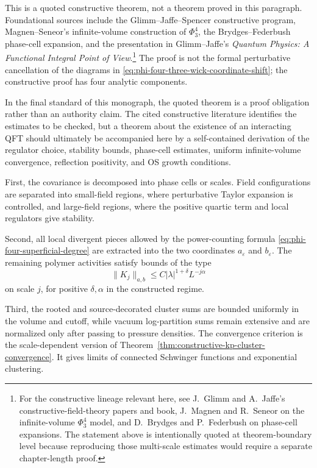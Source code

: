 This is a quoted constructive theorem, not a theorem proved in this
paragraph.  Foundational sources include the Glimm--Jaffe--Spencer
constructive program, Magnen--Seneor's infinite-volume construction of
\(\Phi^4_3\), the Brydges--Federbush phase-cell expansion, and the
presentation in Glimm--Jaffe's \emph{Quantum Physics: A Functional Integral
Point of View}.\footnote{For the constructive lineage relevant here, see
J.~Glimm and A.~Jaffe's constructive-field-theory papers and book,
J.~Magnen and R.~Seneor on the infinite-volume \(\Phi^4_3\) model, and
D.~Brydges and P.~Federbush on phase-cell expansions.  The statement above
is intentionally quoted at theorem-boundary level because reproducing those
multi-scale estimates would require a separate chapter-length proof.}  The
proof is not the formal perturbative cancellation of the diagrams in
\eqref{eq:phi-four-three-wick-coordinate-shift}; the constructive proof has
four analytic components.

In the final standard of this monograph, the quoted theorem is a proof
obligation rather than an authority claim.  The cited constructive literature
identifies the estimates to be checked, but a theorem about the existence of
an interacting QFT should ultimately be accompanied here by a self-contained
derivation of the regulator choice, stability bounds, phase-cell estimates,
uniform infinite-volume convergence, reflection positivity, and OS growth
conditions.

First, the covariance is decomposed into phase cells or scales.  Field
configurations are separated into small-field regions, where perturbative
Taylor expansion is controlled, and large-field regions, where the positive
quartic term and local regulators give stability.

Second, all local divergent pieces allowed by the power-counting formula
\eqref{eq:phi-four-superficial-degree} are extracted into the two
coordinates \(a_\varepsilon\) and \(b_\varepsilon\).  The remaining polymer
activities satisfy bounds of the type
\begin{equation}
  \|K_j\|_{a,b}
  \leq
  C|\lambda|^{1+\delta}L^{-j\alpha}
  \label{eq:phi-four-three-polymer-bound}
\end{equation}
on scale \(j\), for positive \(\delta,\alpha\) in the constructed regime.

Third, the rooted and source-decorated cluster sums are bounded uniformly in
the volume and cutoff, while vacuum log-partition sums remain extensive and
are normalized only after passing to pressure densities.  The convergence
criterion is the scale-dependent version of
Theorem~\ref{thm:constructive-kp-cluster-convergence}.  It gives limits of
connected Schwinger functions and exponential clustering.


